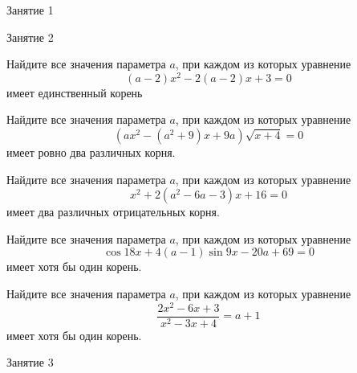 %
%

\begin{class}[number=1]
	\begin{listofex}
		\item Занятие 1
	\end{listofex}
\end{class}

\begin{class}[number=2]
	\begin{listofex}
		\item Занятие 2
	\end{listofex}
\end{class}

\begin{homework}[number=1]
	\begin{listofex}
		\item Найдите все значения параметра \( a \), при каждом из которых уравнение \[ (a-2)x^2-2(a-2)x+3=0 \] имеет единственный корень
		\item Найдите все значения параметра \( a \), при каждом из которых уравнение \[(ax^2-(a^2+9)x+9a)\sqrt{x+4}=0\] имеет ровно два различных корня.
		\item Найдите все значения параметра \( a \), при каждом из которых уравнение \[ x^2+2(a^2-6a-3)x+16=0 \] имеет два различных отрицательных корня.
		\item Найдите все значения параметра \( a \), при каждом из которых уравнение \[ \cos18x+4(a-1)\sin9x-20a+69=0 \] имеет хотя бы один корень.
		\item Найдите все значения параметра \( a \), при каждом из которых уравнение \[ \dfrac{2x^2-6x+3}{x^2-3x+4}=a+1 \] имеет хотя бы один корень.
	\end{listofex}
\end{homework}

\begin{class}[number=3]
	\begin{listofex}
		\item Занятие 3 
	\end{listofex}
\end{class}

